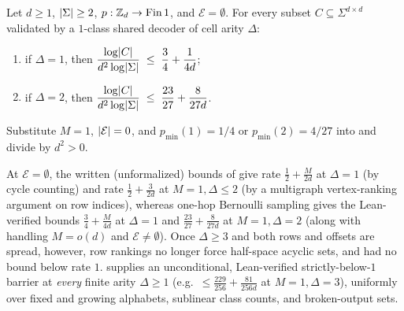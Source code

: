 \begin{corollary}[Finite-$d$ one-class ceilings at $\Delta = 1$ and $\Delta = 2$]\label{cor:arity-two}
Let $d \ge 1$, $\lvert \Sigma \rvert \ge 2$, $p : \mathbb{Z}_d \to \mathrm{Fin}\,1$, and $\mathcal{E} = \emptyset$.
For every subset $C \subseteq \Sigma^{d\times d}$ validated by a $1$-class shared decoder of cell
arity $\Delta$:
\begin{enumerate}[label=(\alph*)]
\item if $\Delta = 1$, then $\dfrac{\log\lvert C \rvert}{d^2\log\lvert \Sigma \rvert} \;\le\; \dfrac{3}{4} + \dfrac{1}{4d}$;
\item if $\Delta = 2$, then $\dfrac{\log\lvert C \rvert}{d^2\log\lvert \Sigma \rvert} \;\le\; \dfrac{23}{27} + \dfrac{8}{27d}$.
\end{enumerate}
\end{corollary}
\begin{outline}
Substitute $M = 1$, $\lvert \mathcal{E} \rvert = 0$, and $p_{\min}(1) = 1/4$ or $p_{\min}(2) = 4/27$ into
 and divide by $d^2 > 0$.
\end{outline}

\begin{remark}\label{rem:compare-prop-621}
At $\mathcal{E} = \emptyset$, the written (unformalized) bounds of
\cite[Proposition~6.21(b) and Proposition~6.22(b)]{SeventeenthPaper2026} give rate
$\frac{1}{2} + \frac{M}{2d}$ at $\Delta = 1$ (by cycle counting) and rate
$\frac{1}{2} + \frac{3}{2d}$ at $M = 1, \Delta \le 2$ (by a multigraph vertex-ranking argument on
row indices), whereas one-hop Bernoulli sampling gives the Lean-verified bounds
$\frac{3}{4} + \frac{M}{4d}$ at $\Delta = 1$ and $\frac{23}{27} + \frac{8}{27d}$ at $M = 1,
\Delta = 2$ (along with handling $M = o(d)$ and $\mathcal{E} \ne \emptyset$). Once $\Delta \ge 3$ and
both rows and offsets are spread, however, row rankings no longer force half-space acyclic sets, and
\cite[Section~6.7 and Problem~9.4(b)]{SeventeenthPaper2026} had no bound below rate $1$.
 supplies an unconditional, Lean-verified strictly-below-$1$ barrier at
\emph{every} finite arity $\Delta \ge 1$ (e.g.\ $\le \frac{229}{256} + \frac{81}{256 d}$ at
$M = 1, \Delta = 3$), uniformly over fixed and growing alphabets, sublinear class counts, and
broken-output sets.
\end{remark}

